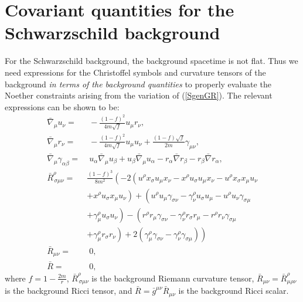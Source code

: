 \documentclass[10pt,twocolumn,preprintnumbers,amsmath,amssymb,nofootinbib
,superscriptaddress]{revtex4-1}
\begin{document}
{{{%
\appendix

\section{Covariant quantities for the Schwarzschild background}\label{appendixS1}

For the Schwarzschild background, the background spacetime is not flat. Thus we need expressions for the Christoffel symbols and curvature tensors of the background \textit{in terms of the background quantities} to properly evaluate the Noether constraints arising from the variation of (\ref{SgenGR}). The relevant expressions can be shown to be:
\begin{align}
\bar{\nabla}_\mu u_\nu=&\;-\frac{\left(1-f\right)^2}{4m\sqrt{f}}u_\mu r_\nu, \\
\bar{\nabla}_\mu r_\nu=&\;-\frac{\left(1-f\right)^2}{4m\sqrt{f}}u_\mu u_\nu+\frac{\left(1-f\right)\sqrt{f}}{2m}\gamma_{\mu\nu}, \\
\bar{\nabla}_\mu\gamma_{\alpha\beta}=&\;u_\alpha\bar{\nabla}_\mu u_\beta + u_\beta\bar{\nabla}_\mu u_\alpha - r_\alpha\bar{\nabla}r_\beta - r_\beta\bar{\nabla}r_\alpha, \\
\bar{R}^\rho_{\,\sigma\mu\nu}=&\frac{\left(1-f\right)^3}{8m^2}\left(-2\left(u^\rho x_\sigma u_\mu x_\nu-x^\rho u_\sigma u_\mu x_\nu - u^\rho x_\sigma x_\mu u _\nu\right.\right. \nonumber\\
&\left.\left. + x^\rho u_\sigma x_\mu u _\nu\right)+\left(u^\rho u_\mu \gamma_{\sigma\nu} - \gamma^\rho_\nu u_\sigma u_\mu - u^\rho u_\nu \gamma_{\sigma\mu} \right.\right.  \nonumber\\
&\left.\left.+ \gamma^\rho_\mu u_\sigma u_\nu\right)-\left(r^\rho r_\mu \gamma_{\sigma\nu} - \gamma^\rho_\nu r_\sigma r_\mu - r^\rho r_\nu \gamma_{\sigma\mu} \right.\right.\nonumber\\
&\left.\left.+ \gamma^\rho_\mu r_\sigma r_\nu\right)+2\left(\gamma^\rho_\mu\gamma_{\sigma\nu}-\gamma^\rho_\nu\gamma_{\sigma\mu}\right)\right)\\
\bar{R}_{\mu\nu}=&\;0,\\
\bar{R}=&\;0,
\end{align}
where $f=1-\frac{2m}{r}$, $\bar{R}^\rho_{\,\sigma\mu\nu}$ is the background Riemann curvature tensor, $\bar{R}_{\mu\nu}=\bar{R}^\rho_{\mu\rho\nu}$ is the background Ricci tensor, and $\bar{R}=\bar{g}^{\mu\nu}\bar{R}_{\mu\nu}$ is the background Ricci scalar.

}}}
\end{document}

